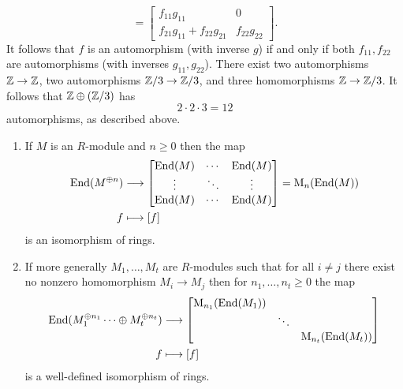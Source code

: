 \begin{example}
\[    = \begin{bmatrix}
        f_{11} g_{11}                 & 0             \\
        f_{21} g_{11} + f_{22} g_{21} & f_{22} g_{22}
      \end{bmatrix}.
  \]
  It follows that $f$ is an automorphism (with inverse $g$) if and only if both $f_{11}, f_{22}$ are automorphisms (with inverses $g_{11}, g_{22}$).
  There exist two automorphisms $\mathbb{Z} \to \mathbb{Z}$, two automorphisms $\mathbb{Z}/3 \to \mathbb{Z}/3$, and three homomorphisms $\mathbb{Z} \to \mathbb{Z}/3$.
  It follows that $\mathbb{Z} \oplus (\mathbb{Z}/3)$ has
  \[
      2 \cdot 2 \cdot 3
    = 12
  \]
  automorphisms, as described above.
\end{example}


\begin{corollary}
  \label{corollary: decomposition of endomorphisms for orthogonal modules}
  \leavevmode
  \begin{enumerate}
    \item
      If $M$ is an $R$-module and $n \geq 0$ then the map
      \begin{align*}
                  \operatorname{End}(M^{\oplus n})
        &\longrightarrow  \begin{bmatrix}
                    \operatorname{End}(M) & \cdots  & \operatorname{End}(M) \\
                    \vdots  & \ddots  & \vdots  \\
                    \operatorname{End}(M) & \cdots  & \operatorname{End}(M)
                  \end{bmatrix}
        =        \operatorname{M}_n( \operatorname{End}(M) )
        \\
                      f
        &\longmapsto  [f]
      \end{align*}
      is an isomorphism of rings.
    \item
      If more generally $M_1, \dotsc, M_t$ are $R$-modules such that for all $i \neq j$ there exist no nonzero homomorphism $M_i \to M_j$ then for $n_1, \dotsc, n_t \geq 0$ the map
      \begin{align*}
                  \operatorname{End}(M_1^{\oplus n_1} \dotsb \oplus M_t^{\oplus n_t})
        &\longrightarrow  \begin{bmatrix}
                      \operatorname{M}_{n_1}( \operatorname{End}(M_1) )
                    & {}
                    & {}
                    \\
                      {}
                    & \ddots
                    & {}
                    \\
                      {}
                    & {}
                    & \operatorname{M}_{n_t}( \operatorname{End}(M_t) )
                  \end{bmatrix}
        \\
                      f
        &\longmapsto  [f]
      \end{align*}
      is a well-defined isomorphism of rings.
  \end{enumerate}
\end{corollary}




